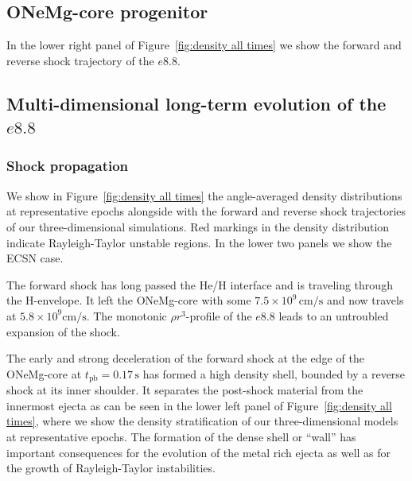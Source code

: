\documentclass[fleqn,usenatbib]{mnras}
\newcommand{\tpb}{\ensuremath{t_{\text{pb}}}}
\begin{document}
\subsection{ONeMg-core progenitor}
\label{sec:Long-term evolution of the e8.8}

In the lower right panel of Figure~\ref{fig:density all times} we show the forward and reverse shock trajectory of the $e8.8$.


\subsection{Multi-dimensional long-term evolution of the $e8.8$}
\label{sec:Multi-dimensional long-term evolution of the e8.8}
\subsubsection{Shock propagation}
\label{sec:shock propagation e8.8}
We show in Figure~\ref{fig:density all times} the angle-averaged density distributions at representative epochs alongside with the forward and reverse shock trajectories of our three-dimensional simulations. Red markings in the density distribution indicate Rayleigh-Taylor unstable regions. In the lower two panels we show the ECSN case.

The forward shock has long passed the He/H interface and is traveling through the H-envelope. It left the ONeMg-core with some $7.5\times 10^{9}\,\text{cm/s}$ and now travels at $5.8\times 10^{9}\mathrm{cm/s}$. The monotonic $\rho r^3$-profile of the $e8.8$ leads to an untroubled expansion of the shock.

The early and strong deceleration of the forward shock at the edge of the ONeMg-core at $\tpb=0.17\,\text{s}$ has formed a high density shell, bounded by a reverse shock at its inner shoulder. It separates the post-shock material from the innermost ejecta as can be seen in the lower left panel of Figure~\ref{fig:density all times}, where we show the density stratification of our three-dimensional models at representative epochs. The formation of the dense shell or ``wall'' \cite{Kifonidis2006} has important consequences for the evolution of the metal rich ejecta as well as for the growth of Rayleigh-Taylor instabilities. 
\end{document}

